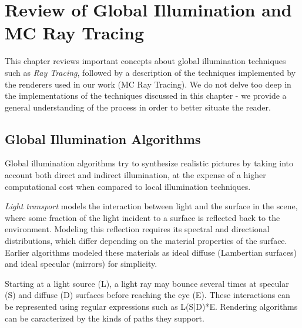 \chapter{Review of Global Illumination and MC Ray Tracing}
\label{sec:theory}

This chapter reviews important concepts about  global illumination techniques such as \textit{Ray Tracing}, followed by 
a description of 
the techniques implemented by the renderers used in our work (MC Ray Tracing). We do not delve too deep in the implementations of the techniques discussed in this chapter - we provide a general understanding of the process in order to better situate the reader.

\section{Global Illumination Algorithms}

Global illumination algorithms try to synthesize realistic pictures by
taking into account both direct and indirect illumination, at the expense of a higher computational cost when compared to local illumination techniques. 

{\it Light transport} models the interaction between light and the surface in the scene, 
where some fraction of the light incident to a surface is reflected back to the environment. Modeling this reflection requires its spectral and directional distributions, which differ depending on the material properties of the surface. Earlier algorithms modeled these materials as ideal diffuse (Lambertian surfaces) and ideal specular (mirrors) for simplicity.

Starting at a light source (L), a light ray may bounce several times at specular (S) and diffuse (D) surfaces before reaching the eye (E). These interactions can be represented using regular expressions such as L(S|D)*E. Rendering algorithms can be caracterized by the kinds of paths they support.

